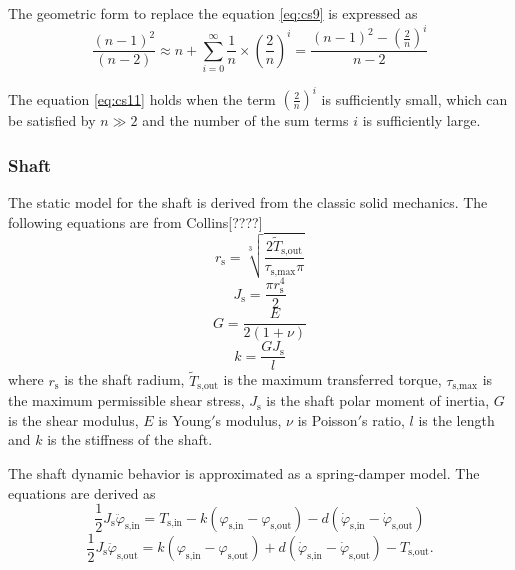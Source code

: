 The geometric form to replace the equation \ref{eq:cs9} is expressed as
\begin{equation} \label{eq:cs11}
\frac{(n-1)^2}{(n-2)} \approx n+\sum_{i=0}^{\infty} \frac{1}{n}\times(\frac{2}{n})^i = \frac{(n-1)^2-(\frac{2}{n})^i}{n-2}
\end{equation}

The equation \ref{eq:cs11} holds when the term $(\frac{2}{n})^i$ is sufficiently small, which can be satisfied by $n \gg 2$ and the number of the sum terms $i$ is sufficiently large. 

\subsubsection*{Shaft}
The static model for the shaft is derived from the classic solid mechanics. The following equations are from Collins[????]
\begin{equation} \label{eq:cs12}
r_{\text{s}} = \sqrt[3]{\frac{2\tilde{T}_{\text{s,out}}}{\tau_{\text{s,max}} \pi}}
\end{equation}
\begin{equation} \label{eq:cs13}
J_{\text{s}} = \frac{\pi r_{\text{s}}^4}{2}
\end{equation}
\begin{equation} \label{eq:cs14}
G = \frac{E}{2(1+\nu)}
\end{equation}
\begin{equation} \label{eq:cs15}
k = \frac{GJ_{\text{s}}}{l}
\end{equation}
where $r_{\text{s}}$ is the shaft radium, $\tilde{T}_{\text{s,out}}$ is the maximum transferred torque, $\tau_{\text{s,max}}$ is the maximum permissible shear stress, $J_{\text{s}}$ is the shaft polar moment of inertia, $G$ is the shear modulus, $E$ is Young$'$s modulus, $\nu$ is Poisson$'$s ratio, $l$ is the length and $k$ is the stiffness of the shaft.
 
The shaft dynamic behavior is approximated as a spring-damper model. The equations are derived as
\begin{equation} \label{eq:cs16}
\frac{1}{2}J_{\text{s}}\ddot{\varphi}_{\text{s,in}} = T_{\text{s,in}}-k(\varphi_{\text{s,in}}-\varphi_{\text{s,out}})-d(\dot{\varphi}_{\text{s,in}}-\dot{\varphi}_{\text{s,out}})
\end{equation}
\begin{equation} \label{eq:cs17}
\frac{1}{2}J_{\text{s}}\ddot{\varphi}_{\text{s,out}} = k(\varphi_{\text{s,in}}-\varphi_{\text{s,out}})+d(\dot{\varphi}_{\text{s,in}}-\dot{\varphi}_{\text{s,out}})-T_{\text{s,out}}.
\end{equation}
